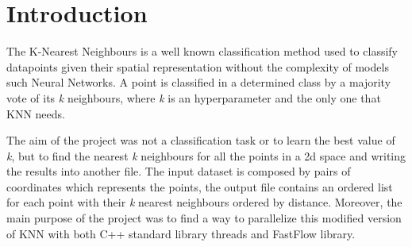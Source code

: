 \section{Introduction}\label{sec:introduction}
The K-Nearest Neighbours is a well known classification method used to classify datapoints given their spatial representation without the complexity of models such Neural Networks. A point is classified in a determined class by a majority vote of its \textit{k} neighbours, where \textit{k} is an hyperparameter and the only one that KNN needs.
\vspace{3mm}

The aim of the project was not a classification task or to learn the best value of \textit{k}, but to find the nearest \textit{k} neighbours for all the points in a 2d space and writing the results into another file. The input dataset is composed by pairs of coordinates which represents the points, the output file contains an ordered list for each point with their \textit{k} nearest neighbours ordered by distance. Moreover, the main purpose of the project was to find a way to parallelize this modified version of KNN with both C++ standard library threads and FastFlow library.